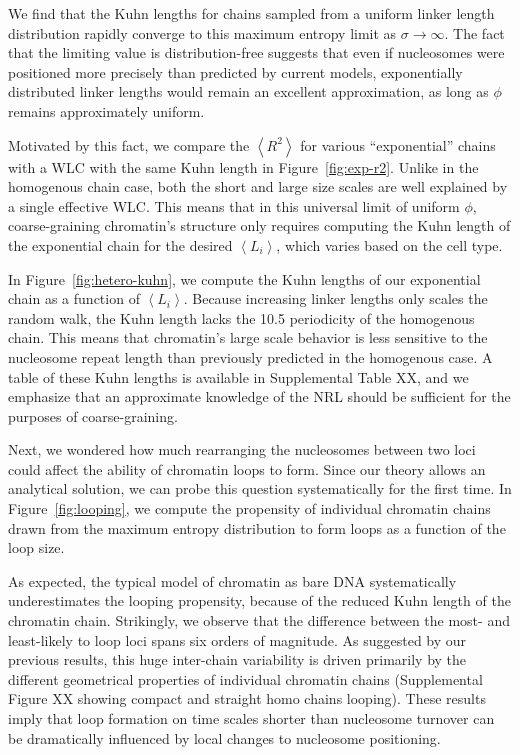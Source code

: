 \documentclass[%
 reprint,
superscriptaddress,
showpacs,preprintnumbers,
 amsmath,amssymb,
 aps,
 prl,
]{revtex4-1}
\newcommand{\RR}{\left\langle{}R^2\right\rangle{}}
\newcommand{\meanli}{\left\langle{}L_i\right\rangle}
\begin{document}
We find that the Kuhn lengths for chains sampled from a
uniform linker length distribution rapidly converge to this
maximum entropy limit as $\sigma\to\infty$.  
The fact that the limiting value is distribution-free suggests that even if nucleosomes were  positioned more precisely than predicted by current models, exponentially distributed linker lengths would remain an excellent approximation, as long as $\phi$ remains approximately uniform.

Motivated by this fact, we compare the $\RR$ for various
    ``exponential'' chains  with a WLC with the same Kuhn length in Figure~\ref{fig:exp-r2}.
Unlike in the homogenous chain case, both the short and large size scales are
    well explained by a single effective WLC.\@
This means that in this universal limit of uniform $\phi$, coarse-graining
    chromatin's structure only requires  computing the Kuhn length of the
    exponential chain for the desired $\meanli$, which varies based on the cell
    type.

In Figure~\ref{fig:hetero-kuhn}, we compute the Kuhn lengths of our exponential
    chain as a function of $\meanli$.
Because increasing linker lengths only scales the random walk, the Kuhn length
    lacks the \SI{10.5}{\basepair} periodicity of the homogenous chain.
This means that chromatin's large scale behavior is less sensitive to
    the nucleosome repeat length than previously predicted in the homogenous
    case.
A table of these Kuhn lengths is available in Supplemental Table XX, and we
    emphasize that an approximate knowledge of the NRL should be sufficient for
    the purposes of coarse-graining.

Next, we wondered how much rearranging the nucleosomes between two
    loci could affect the ability of chromatin loops to form.
Since our theory allows an analytical solution, we can probe this question
    systematically for the first time.
In Figure~\ref{fig:looping}, we compute the propensity of individual chromatin
    chains drawn from the maximum entropy distribution to form loops as a
    function of the loop size.

As expected, the typical model of chromatin as bare DNA systematically
    underestimates the looping propensity, because of the reduced Kuhn length of
    the chromatin chain.
Strikingly, we observe that the difference between the most- and least-likely to
    loop loci spans six orders of magnitude.
As suggested by our previous results, this huge inter-chain variability is
    driven primarily by the different geometrical properties of individual
    chromatin chains (Supplemental Figure XX showing compact and straight homo chains
    looping).
These results imply that loop formation on time scales shorter than nucleosome
    turnover can be dramatically influenced by local changes to nucleosome
    positioning.
\end{document}
